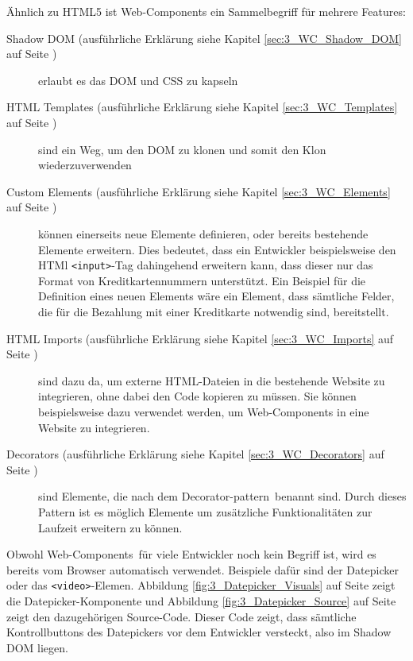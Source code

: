 Ähnlich zu HTML5 ist Web-Components ein Sammelbegriff für mehrere Features:
\begin{description}
\item[Shadow DOM (ausführliche Erklärung siehe Kapitel \ref{sec:3_WC_Shadow_DOM} auf Seite \pageref{sec:3_WC_Shadow_DOM})] erlaubt es das DOM und CSS zu kapseln
\item[HTML Templates (ausführliche Erklärung siehe Kapitel \ref{sec:3_WC_Templates} auf Seite \pageref{sec:3_WC_Templates})] sind ein Weg, um den DOM zu klonen und somit den Klon wiederzuverwenden
\item[Custom Elements (ausführliche Erklärung siehe Kapitel \ref{sec:3_WC_Elements} auf Seite \pageref{sec:3_WC_Elements})] können einerseits neue Elemente definieren, oder bereits bestehende Elemente erweitern. Dies bedeutet, dass ein Entwickler beispielsweise den HTMl \lstinline|<input>|-Tag dahingehend erweitern kann, dass dieser nur das Format von Kreditkartennummern unterstützt. Ein Beispiel für die Definition eines neuen Elements wäre ein Element, dass sämtliche Felder, die für die Bezahlung mit einer Kreditkarte notwendig sind, bereitstellt.
\item[HTML Imports (ausführliche Erklärung siehe Kapitel \ref{sec:3_WC_Imports} auf Seite \pageref{sec:3_WC_Imports})] sind dazu da, um externe HTML-Dateien in die bestehende Website zu integrieren, ohne dabei den Code kopieren zu müssen. Sie können beispielsweise dazu verwendet werden, um Web-Components in eine Website zu integrieren.
\item[Decorators (ausführliche Erklärung siehe Kapitel \ref{sec:3_WC_Decorators} auf Seite \pageref{sec:3_WC_Decorators})] sind Elemente, die nach dem \glqq Decorator-pattern\grqq\ benannt sind. Durch dieses Pattern ist es möglich Elemente um zusätzliche Funktionalitäten zur Laufzeit erweitern zu können.
\end{description}

Obwohl \glqq Web-Components\grqq\ für viele Entwickler noch kein Begriff ist, wird es bereits vom Browser automatisch verwendet. Beispiele dafür sind der Datepicker oder das \lstinline|<video>|-Elemen. Abbildung \ref{fig:3_Datepicker_Visuals} auf Seite \pageref{fig:3_Datepicker_Visuals} zeigt die Datepicker-Komponente und Abbildung \ref{fig:3_Datepicker_Source} auf Seite \pageref{fig:3_Datepicker_Source} zeigt den dazugehörigen Source-Code. Dieser Code zeigt, dass sämtliche Kontrollbuttons des Datepickers vor dem Entwickler \glqq versteckt\grqq , also im Shadow DOM liegen.


